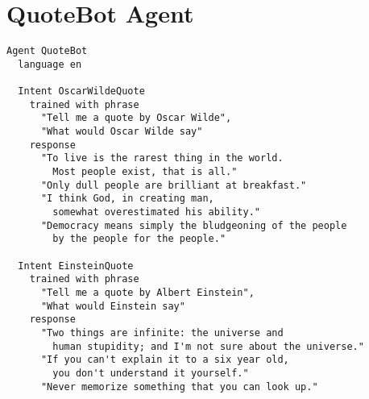\section{QuoteBot Agent}
\label{QuoteBot Agent DSL}

\begin{lstlisting}
Agent QuoteBot
  language en
  
  Intent OscarWildeQuote
    trained with phrase
      "Tell me a quote by Oscar Wilde",
      "What would Oscar Wilde say"
    response
      "To live is the rarest thing in the world. 
        Most people exist, that is all."
      "Only dull people are brilliant at breakfast."
      "I think God, in creating man,
        somewhat overestimated his ability."
      "Democracy means simply the bludgeoning of the people
        by the people for the people."
      
  Intent EinsteinQuote
    trained with phrase
      "Tell me a quote by Albert Einstein",
      "What would Einstein say"
    response
      "Two things are infinite: the universe and
        human stupidity; and I'm not sure about the universe."
      "If you can't explain it to a six year old,
        you don't understand it yourself."
      "Never memorize something that you can look up."
\end{lstlisting}